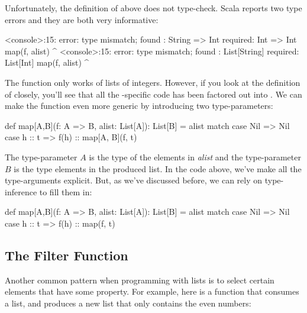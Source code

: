 \documentclass[9pt]{extbook}
\begin{document}
Unfortunately, the definition of  above does not
type-check. Scala reports two type errors and they are both very informative:

\begin{console}
<console>:15: error: type mismatch;
 found   : String => Int
 required: Int => Int
         map(f, alist)
             ^
<console>:15: error: type mismatch;
 found   : List[String]
 required: List[Int]
         map(f, alist)
                  ^
\end{console}

The  function only works of lists of integers. However, if you
look at the definition of  closely, you'll see that all the
-specific code has been factored out into . We
can make the function even more generic by introducing two type-parameters:

\begin{scalacode}
def map[A,B](f: A => B, alist: List[A]): List[B] = alist match {
  case Nil => Nil
  case h :: t => f(h) :: map[A, B](f, t)
}
\end{scalacode}

The type-parameter $A$ is the type of the elements in
\emph{alist} and the type-parameter $B$ is the type elements in the produced list.
In the code above, we've make all the type-arguments explicit. But, as we've
discussed before, we can rely on type-inference to fill them in:

\begin{scalacode}
def map[A,B](f: A => B, alist: List[A]): List[B] = alist match {
  case Nil => Nil
  case h :: t => f(h) :: map(f, t)
}
\end{scalacode}

\subsection{The Filter Function}

Another common pattern when programming with lists is to select certain elements
that have some property. For example, here is a function that consumes a list,
and produces a new list that only contains the even numbers:

\end{document}
